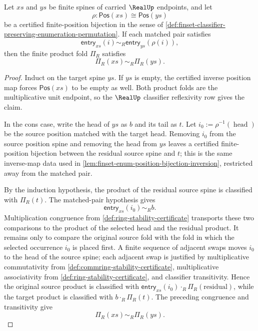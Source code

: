 \begin{lemma}
\label{lem:realup-finite-product-permutation-readback}
Let $xs$ and $ys$ be finite spines of carried $\RealUp$ endpoints, and let
$$
\rho:\mathsf{Pos}(xs)\cong\mathsf{Pos}(ys)
$$
be a certified finite-position bijection in the sense of \autoref{def:finset-classifier-preserving-enumeration-permutation}. If each matched pair satisfies
$$
\mathsf{entry}_{xs}(i)\sim_R\mathsf{entry}_{ys}(\rho(i)),
$$
then the finite product fold $\Pi_R$ satisfies
$$
\Pi_R(xs)\sim_R\Pi_R(ys).
$$
\end{lemma}
\begin{proof}
Induct on the target spine $ys$. If $ys$ is empty, the certified inverse position map forces $\mathsf{Pos}(xs)$ to be empty as well. Both product folds are the multiplicative unit endpoint, so the $\RealUp$ classifier reflexivity row gives the claim.

In the cons case, write the head of $ys$ as $b$ and its tail as $t$. Let $i_0:=\rho^{-1}(\operatorname{head})$ be the source position matched with the target head. Removing $i_0$ from the source position spine and removing the head from $ys$ leaves a certified finite-position bijection between the residual source spine and $t$; this is the same inverse-map data used in \autoref{lem:finset-enum-position-bijection-inversion}, restricted away from the matched pair.

By the induction hypothesis, the product of the residual source spine is classified with $\Pi_R(t)$. The matched-pair hypothesis gives
$$
\mathsf{entry}_{xs}(i_0)\sim_R b.
$$
Multiplication congruence from \autoref{def:ring-stability-certificate} transports these two comparisons to the product of the selected head and the residual product. It remains only to compare the original source fold with the fold in which the selected occurrence $i_0$ is placed first. A finite sequence of adjacent swaps moves $i_0$ to the head of the source spine; each adjacent swap is justified by multiplicative commutativity from \autoref{def:commring-stability-certificate}, multiplicative associativity from \autoref{def:ring-stability-certificate}, and classifier transitivity. Hence the original source product is classified with $\mathsf{entry}_{xs}(i_0)\cdot_R\Pi_R(\text{residual})$, while the target product is classified with $b\cdot_R\Pi_R(t)$. The preceding congruence and transitivity give
$$
\Pi_R(xs)\sim_R\Pi_R(ys).
$$
\end{proof}

